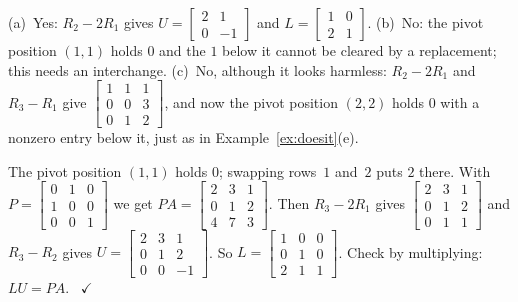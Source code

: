 \documentclass[11pt]{article}
\begin{document}
\begin{description}[leftmargin=0pt,itemsep=5pt]
  \item[Knowledge Check \ref{kc:hasLU}.] (a)~Yes: $R_2-2R_1$ gives $U=\begin{bmatrix}2&1\\0&-1\end{bmatrix}$ and $L=\begin{bmatrix}1&0\\2&1\end{bmatrix}$. (b)~No: the pivot position $(1,1)$ holds $0$ and the $1$ below it cannot be cleared by a replacement; this needs an interchange. (c)~No, although it looks harmless: $R_2-2R_1$ and $R_3-R_1$ give $\begin{bmatrix}1&1&1\\0&0&3\\0&1&2\end{bmatrix}$, and now the pivot position $(2,2)$ holds $0$ with a nonzero entry below it, just as in Example~\ref{ex:doesit}(e).
  \item[Knowledge Check \ref{kc:findP}.] The pivot position $(1,1)$ holds $0$; swapping rows~$1$ and~$2$ puts $2$ there. With $P=\begin{bmatrix}0&1&0\\1&0&0\\0&0&1\end{bmatrix}$ we get $PA=\begin{bmatrix}2&3&1\\0&1&2\\4&7&3\end{bmatrix}$. Then $R_3-2R_1$ gives $\begin{bmatrix}2&3&1\\0&1&2\\0&1&1\end{bmatrix}$ and $R_3-R_2$ gives $U=\begin{bmatrix}2&3&1\\0&1&2\\0&0&-1\end{bmatrix}$. So $L=\begin{bmatrix}1&0&0\\0&1&0\\2&1&1\end{bmatrix}$. Check by multiplying: $LU=PA$. \ $\checkmark$

\end{description}
\end{document}
